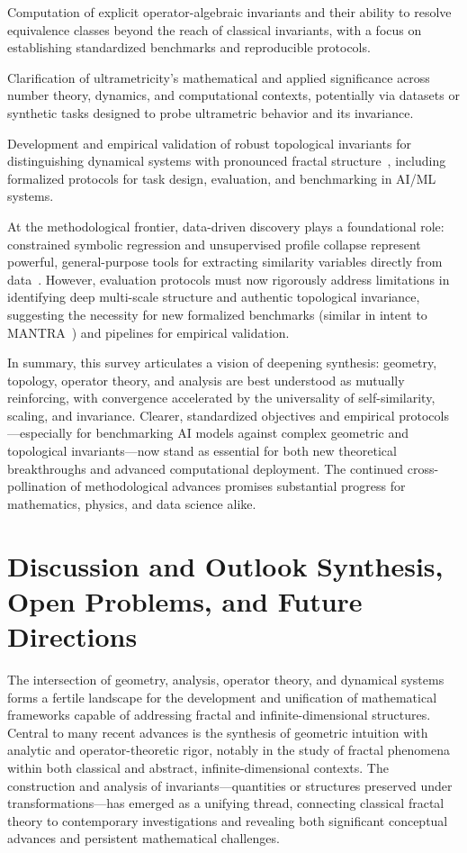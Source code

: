 \documentclass[sigconf]{acmart}
\begin{document}
Computation of explicit operator-algebraic invariants and their ability to resolve equivalence classes beyond the reach of classical invariants, with a focus on establishing standardized benchmarks and reproducible protocols.

Clarification of ultrametricity's mathematical and applied significance across number theory, dynamics, and computational contexts, potentially via datasets or synthetic tasks designed to probe ultrametric behavior and its invariance.

Development and empirical validation of robust topological invariants for distinguishing dynamical systems with pronounced fractal structure~\cite{ref86,ref87,ref89,ref90}, including formalized protocols for task design, evaluation, and benchmarking in AI/ML systems.

At the methodological frontier, data-driven discovery plays a foundational role: constrained symbolic regression and unsupervised profile collapse represent powerful, general-purpose tools for extracting similarity variables directly from data~\cite{ref65}. However, evaluation protocols must now rigorously address limitations in identifying deep multi-scale structure and authentic topological invariance, suggesting the necessity for new formalized benchmarks (similar in intent to MANTRA~\cite{ref26}) and pipelines for empirical validation.

In summary, this survey articulates a vision of deepening synthesis: geometry, topology, operator theory, and analysis are best understood as mutually reinforcing, with convergence accelerated by the universality of self-similarity, scaling, and invariance. Clearer, standardized objectives and empirical protocols---especially for benchmarking AI models against complex geometric and topological invariants---now stand as essential for both new theoretical breakthroughs and advanced computational deployment. The continued cross-pollination of methodological advances promises substantial progress for mathematics, physics, and data science alike.

\section{Discussion and Outlook Synthesis, Open Problems, and Future Directions}

The intersection of geometry, analysis, operator theory, and dynamical systems forms a fertile landscape for the development and unification of mathematical frameworks capable of addressing fractal and infinite-dimensional structures. Central to many recent advances is the synthesis of geometric intuition with analytic and operator-theoretic rigor, notably in the study of fractal phenomena within both classical and abstract, infinite-dimensional contexts. The construction and analysis of invariants—quantities or structures preserved under transformations—has emerged as a unifying thread, connecting classical fractal theory to contemporary investigations and revealing both significant conceptual advances and persistent mathematical challenges.
\end{document}

